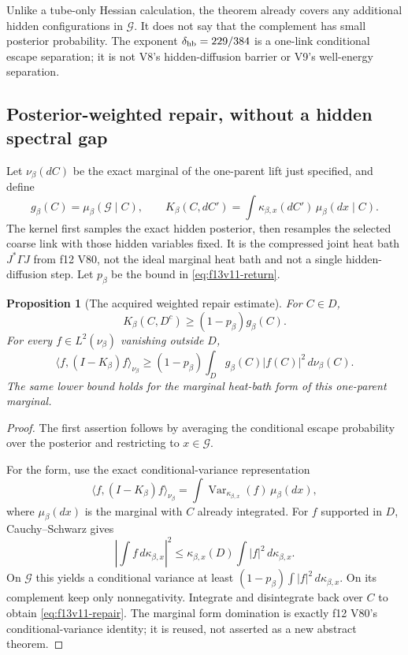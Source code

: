 \documentclass[11pt,oneside]{article}
\newtheorem{proposition}[theorem]{Proposition}
\begin{document}
Unlike a tube-only Hessian calculation, the theorem
already covers any additional hidden configurations
in \(\mathcal G\). It does not say that the
complement has small posterior probability. The
exponent \(\delta_{\rm hb}=229/384\) is a
one-link conditional escape separation; it is not
V8's hidden-diffusion barrier or V9's well-energy
separation.

\subsection{Posterior-weighted repair, without a hidden spectral gap}

Let \(\nu_\beta(dC)\) be the exact marginal of the
one-parent lift just specified, and define
\[
 g_\beta(C)=\mu_\beta(\mathcal G\mid C),\qquad
 K_\beta(C,dC')=
       \int\kappa_{\beta,x}(dC')\,\mu_\beta(dx\mid C).
\]
The kernel first samples the exact hidden posterior,
then resamples the selected coarse link with those
hidden variables fixed. It is the compressed joint
heat bath \(J^*\Gamma J\) from f12 V80, not the ideal
marginal heat bath and not a single hidden-diffusion
step. Let \(p_\beta\) be the bound in
\eqref{eq:f13v11-return}.

\begin{proposition}[The acquired weighted repair estimate]
\label{prop:f13v11-repair}
For \(C\in D\),
\[
 K_\beta(C,D^c)\ge(1-p_\beta)g_\beta(C).
\]
For every \(f\in L^2(\nu_\beta)\) vanishing outside
\(D\),
\begin{equation}\label{eq:f13v11-repair}
 \langle f,(I-K_\beta)f\rangle_{\nu_\beta}
       \ge(1-p_\beta)\int_D g_\beta(C)|f(C)|^2\,d\nu_\beta(C).
\end{equation}
The same lower bound holds for the marginal heat-bath
form of this one-parent marginal.
\end{proposition}

\begin{proof}
The first assertion follows by averaging the
conditional escape probability over the posterior
and restricting to \(x\in\mathcal G\).

For the form, use the exact conditional-variance
representation
\[
 \langle f,(I-K_\beta)f\rangle_{\nu_\beta}
   =\int\operatorname{Var}_{\kappa_{\beta,x}}(f)
                              \,\mu_\beta(dx),
\]
where \(\mu_\beta(dx)\) is the marginal with \(C\)
already integrated. For \(f\) supported in \(D\),
Cauchy--Schwarz gives
\[
 \left|\int f\,d\kappa_{\beta,x}\right|^2
 \le\kappa_{\beta,x}(D)
                         \int |f|^2\,d\kappa_{\beta,x}.
\]
On \(\mathcal G\) this yields a conditional variance
at least \((1-p_\beta)\int|f|^2\,d\kappa_{\beta,x}\).
On its complement keep only nonnegativity. Integrate
and disintegrate back over \(C\) to obtain
\eqref{eq:f13v11-repair}. The marginal form domination
is exactly f12 V80's conditional-variance identity;
it is reused, not asserted as a new abstract theorem.
\end{proof}
\end{document}
